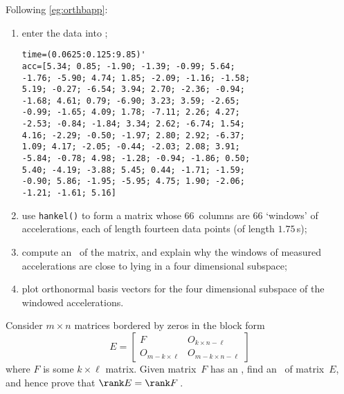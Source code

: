 \begin{exercise}
Following \autoref{eg:orthbapp}:
\begin{enumerate}
\item enter the data into \script;
\setbox\ajrqrbox\hbox{}%
\marginpar{\usebox{\ajrqrbox}}%
\begin{verbatim}
time=(0.0625:0.125:9.85)'
acc=[5.34; 0.85; -1.90; -1.39; -0.99; 5.64;
-1.76; -5.90; 4.74; 1.85; -2.09; -1.16; -1.58;
5.19; -0.27; -6.54; 3.94; 2.70; -2.36; -0.94;
-1.68; 4.61; 0.79; -6.90; 3.23; 3.59; -2.65;
-0.99; -1.65; 4.09; 1.78; -7.11; 2.26; 4.27;
-2.53; -0.84; -1.84; 3.34; 2.62; -6.74; 1.54;
4.16; -2.29; -0.50; -1.97; 2.80; 2.92; -6.37;
1.09; 4.17; -2.05; -0.44; -2.03; 2.08; 3.91;
-5.84; -0.78; 4.98; -1.28; -0.94; -1.86; 0.50;
5.40; -4.19; -3.88; 5.45; 0.44; -1.71; -1.59;
-0.90; 5.86; -1.95; -5.95; 4.75; 1.90; -2.06;
-1.21; -1.61; 5.16]
\end{verbatim}
\item use \verb|hankel()|  to form a matrix whose 66~columns are 66 `windows' of accelerations, each of length fourteen data points (of length \(1.75\)\,s);

\item compute an \svd\ of the matrix, and explain why the windows of measured accelerations are close to lying in a four dimensional subspace;

\item plot orthonormal basis vectors for the four dimensional subspace of the windowed accelerations.
\end{enumerate}
\end{exercise}







\begin{exercise} \label{ex:rankobord} 
Consider \(m\times n\) matrices bordered by zeros in the block form
\begin{equation*}
E=\begin{bmatrix} F&O_{k\times n-\ell}
\\O_{m-k\times \ell}& O_{m-k\times n-\ell} \end{bmatrix}
\end{equation*}
where \(F\) is some \(k\times\ell\) matrix.
Given matrix~\(F\) has an \svd, find an \svd\ of matrix~\(E\), and hence prove that \(\rank E=\rank F\)\,.
\end{exercise}

